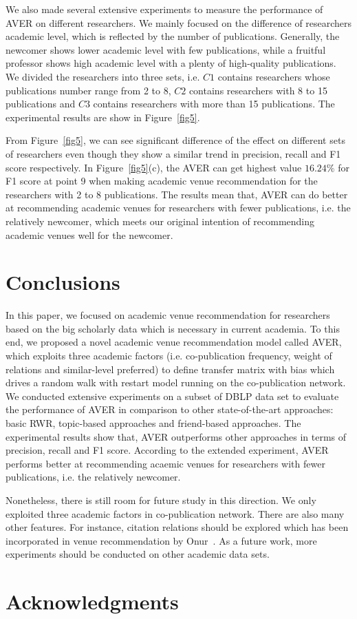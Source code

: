 \documentclass[9pt]{acm_proc_article-sp}
\begin{document}
We also made several extensive experiments to measure the performance of AVER on different researchers. We mainly focused on the difference of researchers academic level, which is reflected by the number of publications. Generally, the newcomer shows lower academic level with few publications, while a fruitful professor shows high academic level with a plenty of high-quality publications. We divided the researchers into three sets, i.e. $C1$ contains researchers whose publications number range from 2 to 8, $C2$ contains researchers with 8 to 15 publications and $C3$ contains researchers with more than 15 publications. The experimental results are show in Figure~\ref{fig5}.

From Figure~\ref{fig5}, we can see significant difference of the effect on different sets of researchers even though they show a similar trend in precision, recall and F1 score respectively. In Figure~\ref{fig5}(c), the AVER can get highest value $16.24\%$ for F1 score at point 9 when making academic venue recommendation for the researchers with 2 to 8 publications. The results mean that, AVER can do better at recommending academic venues for researchers with fewer publications, i.e. the relatively newcomer, which meets our original intention of recommending academic venues well for the newcomer.

\section{Conclusions}
In this paper, we focused on academic venue recommendation for researchers based on the big scholarly data which is necessary in current academia. To this end, we proposed a novel academic venue recommendation model called AVER, which exploits three academic factors (i.e. co-publication frequency, weight of relations and similar-level preferred) to define transfer matrix with bias which drives a random walk with restart model running on the co-publication network. We conducted extensive experiments on a subset of DBLP data set to evaluate the performance of AVER in comparison to other state-of-the-art approaches: basic RWR, topic-based approaches and friend-based approaches. The experimental results show that, AVER outperforms other approaches in terms of precision, recall and F1 score. According to the extended experiment, AVER performs better at recommending acaemic venues for researchers with fewer publications, i.e. the relatively newcomer.

Nonetheless, there is still room for future study in this direction. We only exploited three academic factors in co-publication network. There are also many other features. For instance, citation relations should be explored which has been incorporated in venue recommendation by Onur~\cite{kuccuktuncc2012recommendation}. As a future work, more experiments should be conducted on other academic data sets.

\section{Acknowledgments}




\balancecolumns
\end{document}
